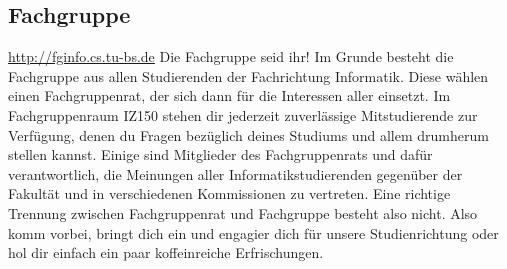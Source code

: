 \subsection{Fachgruppe}
	\label{fachgruppe}
	\url{http://fginfo.cs.tu-bs.de}
	Die Fachgruppe seid ihr! Im Grunde besteht die Fachgruppe aus allen Studierenden der Fachrichtung Informatik. Diese wählen einen Fachgruppenrat, der sich dann für die Interessen aller einsetzt. 
	Im Fachgruppenraum IZ150 stehen dir jederzeit zuverlässige Mitstudierende zur Verfügung, denen du Fragen bezüglich deines Studiums und allem drumherum stellen kannst. Einige sind Mitglieder des Fachgruppenrats und dafür verantwortlich, die Meinungen aller Informatikstudierenden gegenüber der Fakultät und in verschiedenen Kommissionen zu vertreten. Eine richtige Trennung zwischen Fachgruppenrat und Fachgruppe besteht also nicht. Also komm vorbei, bringt dich ein und engagier dich für unsere Studienrichtung oder hol dir einfach ein paar koffeinreiche Erfrischungen. 
